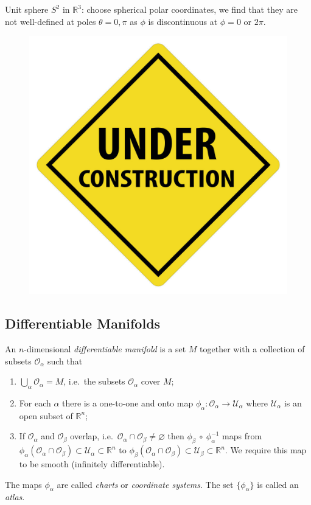 \documentclass[a4paper,11pt]{article}
\begin{document}
	\begin{ex}
		Unit sphere $S^2$ in $\mathbb{R}^3$: choose spherical polar coordinates, we find that they are not well-defined at poles $\theta = 0, \pi$ as $\phi$ is discontinuous at $\phi = 0$ or $2\pi$.

		\begin{figure}[H]
			\centering
			\includegraphics[width=0.5\linewidth]{fig/default}
		\end{figure}
	\end{ex}

	\subsection{Differentiable Manifolds}

	\begin{defi}
		An $n$-dimensional \emph{differentiable manifold} is a set $M$ together with a collection of subsets $\mathcal{O}_{\alpha}$ such that
		\begin{enumerate}
			\item $\bigcup_{\alpha} \mathcal{O}_\alpha = M$, i.e.\ the subsets $\mathcal{O}_{\alpha}$ cover $M$;
			\item For each $\alpha$ there is a one-to-one and onto map $\phi_{\alpha}: \mathcal{O}_{\alpha} \to \mathcal{U}_{\alpha}$ where $\mathcal{U}_{\alpha}$ is an open subset of $\mathbb{R}^n$;
			\item If $\mathcal{O}_{\alpha}$ and $\mathcal{O}_{\beta}$ overlap, i.e.\ $\mathcal{O}_\alpha \cap \mathcal{O}_\beta \neq \varnothing$ then $\phi_{\beta} \ \circ \ \phi_{\alpha}^{-1}$ maps from $\phi_{\alpha}(\mathcal{O}_{\alpha} \cap \mathcal{O}_{\beta}) \subset \mathcal{U}_{\alpha} \subset \mathbb{R}^n$ to $\phi_{\beta}(\mathcal{O}_\alpha \cap \mathcal{O}_\beta) \subset \mathcal{U}_\beta \subset \mathbb{R}^n$. We require this map to be smooth (infinitely differentiable).    
		\end{enumerate}
		
		The maps $\phi_\alpha$ are called \emph{charts} or \emph{coordinate systems}. The set $\{\phi_\alpha\}$ is called an \emph{atlas}.
	
	\end{defi}
\end{document}
